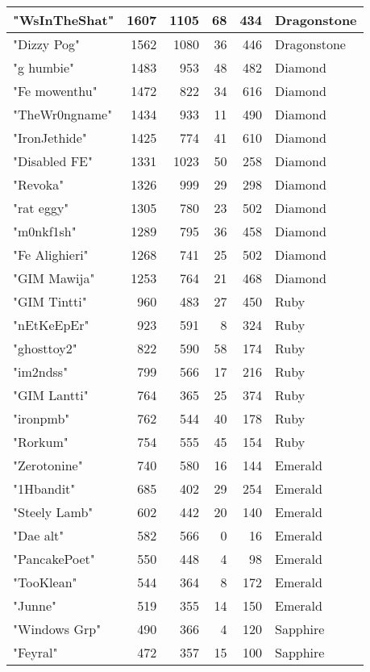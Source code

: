 \documentclass{article}
\begin{document}
\begin{table}[htbp]
\begin{tabular}{|l|r|r|r|r|l|}
"WsInTheShat" & 1607 & 1105 & 68 & 434 & Dragonstone \\ \hline
"Dizzy Pog" & 1562 & 1080 & 36 & 446 & Dragonstone \\ \hline
"g humbie" & 1483 & 953 & 48 & 482 & Diamond \\ \hline
"Fe mowenthu" & 1472 & 822 & 34 & 616 & Diamond \\ \hline
"TheWr0ngname" & 1434 & 933 & 11 & 490 & Diamond \\ \hline
"IronJethide" & 1425 & 774 & 41 & 610 & Diamond \\ \hline
"Disabled FE" & 1331 & 1023 & 50 & 258 & Diamond \\ \hline
"Revoka" & 1326 & 999 & 29 & 298 & Diamond \\ \hline
"rat eggy" & 1305 & 780 & 23 & 502 & Diamond \\ \hline
"m0nkf1sh" & 1289 & 795 & 36 & 458 & Diamond \\ \hline
"Fe Alighieri" & 1268 & 741 & 25 & 502 & Diamond \\ \hline
"GIM Mawija" & 1253 & 764 & 21 & 468 & Diamond \\ \hline
"GIM Tintti" & 960 & 483 & 27 & 450 & Ruby \\ \hline
"nEtKeEpEr" & 923 & 591 & 8 & 324 & Ruby \\ \hline
"ghosttoy2" & 822 & 590 & 58 & 174 & Ruby \\ \hline
"im2ndss" & 799 & 566 & 17 & 216 & Ruby \\ \hline
"GIM Lantti" & 764 & 365 & 25 & 374 & Ruby \\ \hline
"ironpmb" & 762 & 544 & 40 & 178 & Ruby \\ \hline
"Rorkum" & 754 & 555 & 45 & 154 & Ruby \\ \hline
"Zerotonine" & 740 & 580 & 16 & 144 & Emerald \\ \hline
"1Hbandit" & 685 & 402 & 29 & 254 & Emerald \\ \hline
"Steely Lamb" & 602 & 442 & 20 & 140 & Emerald \\ \hline
"Dae alt" & 582 & 566 & 0 & 16 & Emerald \\ \hline
"PancakePoet" & 550 & 448 & 4 & 98 & Emerald \\ \hline
"TooKlean" & 544 & 364 & 8 & 172 & Emerald \\ \hline
"Junne" & 519 & 355 & 14 & 150 & Emerald \\ \hline
"Windows Grp" & 490 & 366 & 4 & 120 & Sapphire \\ \hline
"Feyral" & 472 & 357 & 15 & 100 & Sapphire \\ \hline

\end{tabular}
\end{table}
\end{document}
